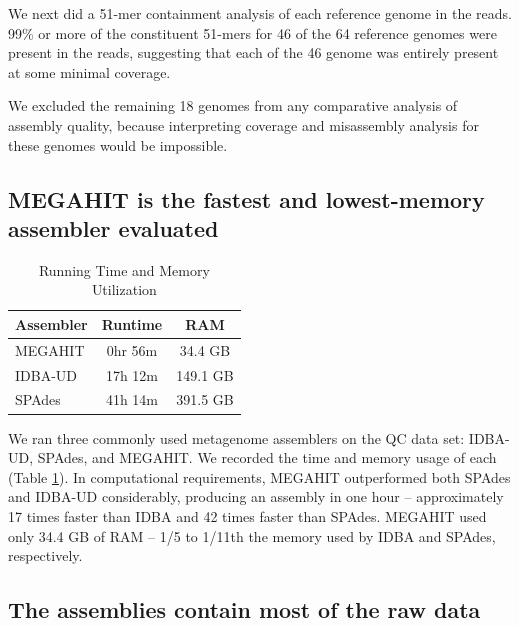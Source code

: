\documentclass[10pt,a4paper,twocolumn]{article}
\begin{document}

We next did a 51-mer containment analysis of each reference genome in
the reads.  99\% or more of the constituent 51-mers for 46 of the 64
reference genomes were present in the reads, suggesting that each
of the 46 genome was entirely present at some  minimal coverage.

We excluded the remaining 18 genomes from any comparative
analysis of assembly quality, because interpreting coverage and
misassembly analysis for these genomes would be impossible.



\subsection*{MEGAHIT is the fastest and lowest-memory assembler evaluated}

 \begin{table}[h]
\caption{Running Time and Memory Utilization}
\centering
\begin{tabular}{|l|c|c|}
\hline
\textbf{Assembler} & \textbf{Runtime} & \textbf{RAM} \\ [0.5ex]
\hline
MEGAHIT & 0hr 56m & 34.4 GB \\
\hline
IDBA-UD & 17h 12m & 149.1 GB \\
\hline
SPAdes & 41h 14m & 391.5 GB \\
\hline

\end{tabular}
\label{table:time-memory}
\end{table}

 We ran three commonly used metagenome assemblers on the QC data set:
IDBA-UD, SPAdes, and MEGAHIT. We recorded the time and memory usage of
each (Table \ref{table:time-memory}).  In computational requirements, MEGAHIT outperformed both
SPAdes and IDBA-UD considerably, producing an assembly in one hour --
approximately 17 times faster than IDBA and 42 times faster than
SPAdes.  MEGAHIT used only 34.4 GB of RAM -- 1/5 to 1/11th
the memory used by IDBA and SPAdes, respectively.

\subsection*{The assemblies contain most of the raw data}
\end{document}
